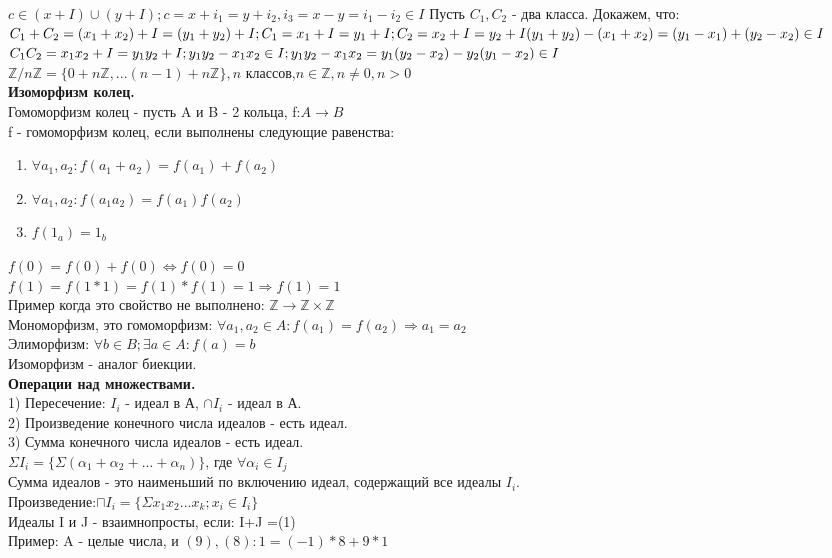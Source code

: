 \documentclass{article}
\begin{document}
$c \in (x+I)\cup (y+I); c = x+i_1=y+i_2, i_3 = x-y=i_1-i_2 \in I$
Пусть $C_1, C_2$ - два класса. Докажем, что:\\ $C_1+C_2=(x_1+x_2)+I = (y_1+y_2)+I; \\C_1 = x_1+I=y_1+I; C_2 = x_2+I=y_2+I \\ (y_1+y_2)-(x_1+x_2) = (y_1-x_1)+(y_2-x_2) \in I$\\
$C_1C_2 =x_1x_2+I=y_1y_2+I;\\
y_1y_2-x_1x_2 \in I; y_1y_2-x_1x_2=y_1(y_2-x_2)-y_2(y_1-x_2) \in I$\\
$\mathbb{Z}/n\mathbb{Z} = \lbrace 0+n\mathbb{Z},... (n-1)+n\mathbb{Z} \rbrace, n$ классов,$ n \in \mathbb{Z}, n \neq 0, n>0$\\
\textbf{Изоморфизм колец.}\\
Гомоморфизм колец - пусть A и B - 2 кольца, f:$A \rightarrow B$\\
f - гомоморфизм колец, если выполнены следующие равенства:
\begin{enumerate}
\item $\forall a_1,a_2: f(a_1+a_2) = f(a_1)+f(a_2)$
\item $\forall a_1,a_2: f(a_1a_2) = f(a_1)f(a_2)$
\item $f(1_a) = 1_b$
\end{enumerate}$
f(0)=f(0)+f(0) \Leftrightarrow f(0) = 0$\\
$f(1)=f(1*1) = f(1)*f(1)=1 \Rightarrow f(1) = 1$\\
Пример когда это свойство не выполнено: $\mathbb{Z} \rightarrow \mathbb{Z} \times \mathbb{Z}$\\
Мономорфизм, это гомоморфизм: $\forall a_1,a_2 \in A: f(a_1)=f(a_2) \Rightarrow a_1=a_2$\\
Элиморфизм: $\forall b \in B; \exists a \in A: f(a) = b$\\
Изоморфизм - аналог биекции.\\
\textbf{Операции над множествами.}\\
1) Пересечение: $I_i$ - идеал в А, $\cap I_i$ - идеал в А.\\
2) Произведение конечного числа идеалов - есть идеал.\\
3) Сумма конечного числа идеалов - есть идеал.\\
$\Sigma I_i = \lbrace \Sigma (\alpha_1+\alpha_2+...+\alpha_n) \rbrace$, где $\forall \alpha_i \in I_j$\\
Сумма идеалов - это наименьший по включению идеал, содержащий все идеалы $I_i$.\\
Произведение:$\sqcap I_i = \lbrace \Sigma x_1x_2...x_k; x_i \in I_i \rbrace$\\
Идеалы I и J - взаимнопросты, если: I+J =(1)\\
Пример: A - целые числа, и $(9), (8): 1 =(-1)*8+9*1$
\end{document}
